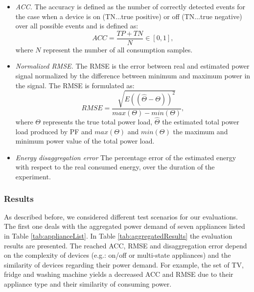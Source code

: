 \documentclass{article}
\begin{document}
\begin{itemize}
  \item \textit{\ac{ACC}.} The accuracy is defined as the number of correctly detected events for the case when a device is on (TN$\ldots$true positive) or off (TN$\ldots$true negative) over all possible events and is defined as:
  \begin{equation}
ACC = \frac{TP+TN}{N} \in [0,1],
\end{equation}
where $N$ represent the number of all consumption samples.
  \item \textit{Normalized \ac{RMSE}.} The \ac{RMSE} is the error between real and estimated power signal normalized by the difference between minimum and maximum power in the signal. The \ac{RMSE} is formulated as:
  \begin{equation}
{RMSE} = \frac{\sqrt{E((\hat{\Theta}-\Theta))^2}}{max(\Theta)-min(\Theta)},
\end{equation}
where $\Theta$ represents the true total power load, $\hat{\Theta}$ the estimated total power load produced by \ac{PF} and $max(\Theta)$ and $min(\Theta)$ the maximum and minimum power value of the total power load.
  \item \textit{Energy disaggregation error} The percentage error of the estimated energy with respect to the real consumed energy, over the duration of the experiment.
\end{itemize}

\subsubsection{Results}


As described before, we considered different test scenarios for our evaluations.
The first one deals with the aggregated power demand of seven appliances listed in Table \ref{tab:applianceList}.
In Table \ref{tab:aggregatedResults} the evaluation results are presented.
The reached \ac{ACC}, \ac{RMSE} and disaggregation error depend on the complexity of devices (e.g.: on/off or multi-state appliances) and the similarity of devices regarding their power demand.
For example, the set of TV, fridge and washing machine yields a decreased \ac{ACC} and \ac{RMSE} due to their appliance type and their similarity of consuming power.
\end{document}
